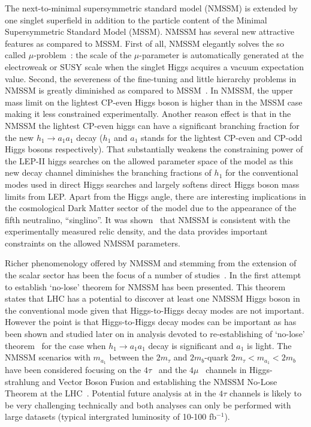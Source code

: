 \documentclass[aps,prl,nofootinbib,superscriptaddress]{revtex4}
\begin{document}
The next-to-minimal supersymmetric standard model (NMSSM)
\cite{Nilles:1982dy,Frere:1983ag,Ellis:1988er,%
Drees:1988fc,Ellwanger:1993hn,Ellwanger:1993xa,%
Elliott:1993bs,Pandita:1993tg,Ellwanger:1995ru,%
King:1995vk,Franke:1995tc,Ellwanger:1996gw,Miller:2003ay}
is extended by one singlet superfield in addition to the particle content
of the Minimal Supersymmetric Standard Model (MSSM).
NMSSM has several new attractive features as compared to MSSM.
First  of all, NMSSM elegantly solves the so called $\mu$-problem~\cite{mu-problem}:
the scale of the $\mu$-parameter is automatically generated 
at the electroweak or SUSY  scale when the singlet Higgs acquires 
a vacuum expectation value. Second, the severeness of the fine-tuning and little hierarchy 
problems in NMSSM is greatly diminished as compared to MSSM~\cite{Dermisek:2005ar}.
In NMSSM, the upper mass limit on the lightest CP-even Higgs boson is higher than in the 
MSSM case making it less constrained experimentally. Another reason effect is that in the 
NMSSM the lightest CP-even higgs can have a significant branching fraction for the 
new $h_1\to a_1 a_1$ decay ($h_1$ and $a_1$ stands for the lightest CP-even and CP-odd 
Higgs bosons respectively). That substantially weakens the constraining power of the 
LEP-II higgs searches on the allowed parameter space of the model as this new decay 
channel diminishes the branching fractions of $h_1$ for the conventional modes used 
in direct Higgs searches and largely softens direct Higgs boson mass limits from LEP. 
Apart from the Higgs angle, there are interesting implications in the cosmological Dark
Matter sector of the model due to the appearance of the fifth neutralino, ``singlino''. 
It was shown~\cite{nmssm-dm} that NMSSM is consistent with the experimentally measured 
relic density, and the data provides important constraints on the allowed NMSSM 
parameters.

Richer phenomenology offered by NMSSM and stemming from the extension of the scalar sector has 
been the focus of a number of studies~\cite{nmssm-ph1,nmssm-ph2,nmssm-ph2b,nmssm-ph3,nmssm-ph4,nmssm-ph5,nmssm-ph6,nmssm-ph6a,nmssm-ph7}.
In \cite{nmssm-ph2} the first attempt to establish `no-lose' theorem for NMSSM
has been presented. This theorem states that LHC has a potential to discover at least one
NMSSM Higgs boson in the conventional mode given that Higgs-to-Higgs decay modes 
are not important. However the point is that  Higgs-to-Higgs decay modes
can be important as has been shown and studied later on
in analysis devoted to re-establishing   of `no-lose' 
theorem~\cite{nmssm-ph2b,nmssm-ph3,nmssm-ph4,nmssm-ph5,nmssm-ph6,nmssm-ph6a,nmssm-ph7}
for the case when  $h_1\to a_1 a_1$ decay is significant
and $a_1$ is light. The NMSSM scenarios with $m_{a_1}$ between the $2m_{\tau}$ and $2m_b$-quark 
$2m_\tau <m_{a_1}<2m_b$ have been considered focusing on the $4\tau$~\cite{nmssm-ph7} 
and the $4\mu$~\cite{4mu-pheno} channels in Higgs-strahlung and Vector Boson Fusion
and establishing the NMSSM No-Lose Theorem at the LHC~\cite{nmssm-ph7}.
Potential future analysis at in the $4\tau$ channels is likely to be very challenging technically 
and both analyses can only be performed with large datasets (typical intergrated luminosity of 
10-100 fb$^{-1}$).
\end{document}
